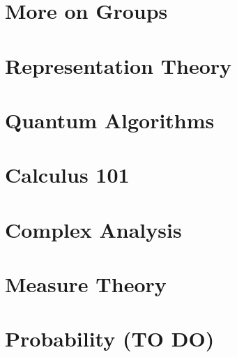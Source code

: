 \documentclass[11pt,a5paper,twoside=semi,openright,numbers=noenddot,titlepage=false]{scrbook}
\begin{document}
\part{More on Groups}
\label{part:groups}
\parttoc




\part{Representation Theory}
\label{part:repth}
\parttoc





\part{Quantum Algorithms}
\label{part:quantum}
\parttoc




\part{Calculus 101}
\label{part:calc}
\parttoc






\part{Complex Analysis}
\label{part:cmplxana}
\parttoc





\part{Measure Theory}
\label{part:measure}
\parttoc






\part{Probability (TO DO)}
\label{part:prob}
\parttoc


\end{document}
